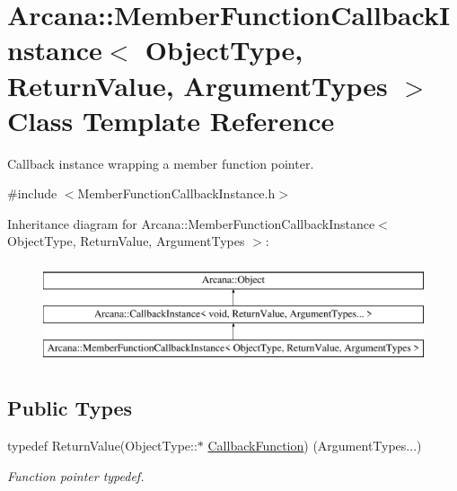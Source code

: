 \hypertarget{class_arcana_1_1_member_function_callback_instance}{}\section{Arcana\+:\+:Member\+Function\+Callback\+Instance$<$ Object\+Type, Return\+Value, Argument\+Types $>$ Class Template Reference}
\label{class_arcana_1_1_member_function_callback_instance}


Callback instance wrapping a member function pointer.  




{\ttfamily \#include $<$Member\+Function\+Callback\+Instance.\+h$>$}

Inheritance diagram for Arcana\+:\+:Member\+Function\+Callback\+Instance$<$ Object\+Type, Return\+Value, Argument\+Types $>$\+:\begin{figure}[H]
\begin{center}
\leavevmode
\includegraphics[height=3.000000cm]{class_arcana_1_1_member_function_callback_instance}
\end{center}
\end{figure}
\subsection*{Public Types}
\begin{DoxyCompactItemize}
\item 
\mbox{\label{class_arcana_1_1_member_function_callback_instance_ad7ba7b4937f6301718e8dffb89068f20}} 
typedef Return\+Value(Object\+Type\+::$\ast$ \mbox{\hyperlink{class_arcana_1_1_member_function_callback_instance_ad7ba7b4937f6301718e8dffb89068f20}{Callback\+Function}}) (Argument\+Types...)
\begin{DoxyCompactList}\small\item\em Function pointer typedef. \end{DoxyCompactList}\end{DoxyCompactItemize}
